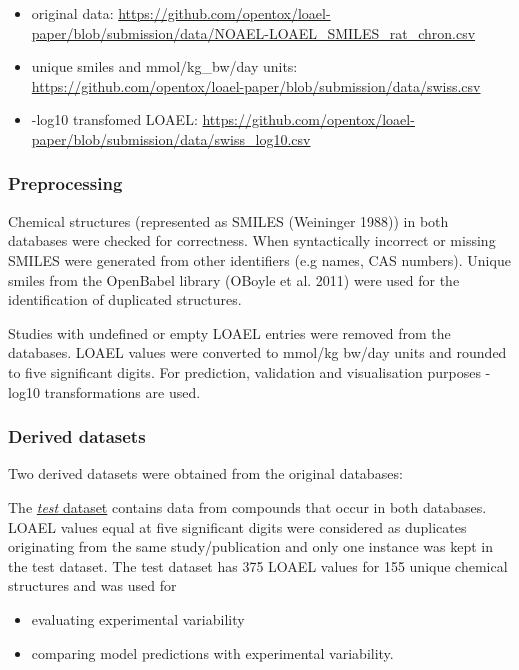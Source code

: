 \documentclass[]{achemso}
\providecommand{\tightlist}{%
  \setlength{\itemsep}{0pt}\setlength{\parskip}{0pt}}
\begin{document}
\begin{itemize}
\tightlist
\item
  original data:
  \url{https://github.com/opentox/loael-paper/blob/submission/data/NOAEL-LOAEL_SMILES_rat_chron.csv}
\item
  unique smiles and mmol/kg\_bw/day units:
  \url{https://github.com/opentox/loael-paper/blob/submission/data/swiss.csv}
\item
  -log10 transfomed LOAEL:
  \url{https://github.com/opentox/loael-paper/blob/submission/data/swiss_log10.csv}
\end{itemize}

\subsubsection{Preprocessing}\label{preprocessing}

Chemical structures (represented as SMILES (Weininger 1988)) in both
databases were checked for correctness. When syntactically incorrect or
missing SMILES were generated from other identifiers (e.g names, CAS
numbers). Unique smiles from the OpenBabel library (OBoyle et al. 2011)
were used for the identification of duplicated structures.

Studies with undefined or empty LOAEL entries were removed from the
databases. LOAEL values were converted to mmol/kg bw/day units and
rounded to five significant digits. For prediction, validation and
visualisation purposes -log10 transformations are used.

\subsubsection{Derived datasets}\label{derived-datasets}

Two derived datasets were obtained from the original databases:

The
\href{https://github.com/opentox/loael-paper/blob/submission/data/test_log10.csv}{\emph{test}
dataset} contains data from compounds that occur in both databases.
LOAEL values equal at five significant digits were considered as
duplicates originating from the same study/publication and only one
instance was kept in the test dataset. The test dataset has 375 LOAEL
values for 155 unique chemical structures and was used for

\begin{itemize}
\tightlist
\item
  evaluating experimental variability
\item
  comparing model predictions with experimental variability.
\end{itemize}
\end{document}
